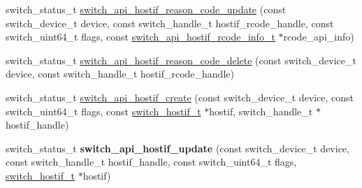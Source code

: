\begin{DoxyCompactItemize}
\item 
switch\+\_\+status\+\_\+t \hyperlink{group__HostInterface_ga6dd335d280eb94c14d97bece73a66b8d}{switch\+\_\+api\+\_\+hostif\+\_\+reason\+\_\+code\+\_\+update} (const switch\+\_\+device\+\_\+t device, const switch\+\_\+handle\+\_\+t hostif\+\_\+rcode\+\_\+handle, const switch\+\_\+uint64\+\_\+t flags, const \hyperlink{group__HostInterface_gad572618a94aec43492d76730093e105f}{switch\+\_\+api\+\_\+hostif\+\_\+rcode\+\_\+info\+\_\+t} $\ast$rcode\+\_\+api\+\_\+info)
\item 
switch\+\_\+status\+\_\+t \hyperlink{group__HostInterface_gab04148c1eb71593a4507380eb574f2d3}{switch\+\_\+api\+\_\+hostif\+\_\+reason\+\_\+code\+\_\+delete} (const switch\+\_\+device\+\_\+t device, const switch\+\_\+handle\+\_\+t hostif\+\_\+rcode\+\_\+handle)
\item 
switch\+\_\+status\+\_\+t \hyperlink{group__HostInterface_ga5d24f6986bc6f45ac5993e7ece399cac}{switch\+\_\+api\+\_\+hostif\+\_\+create} (const switch\+\_\+device\+\_\+t device, const switch\+\_\+uint64\+\_\+t flags, const \hyperlink{group__HostInterface_ga3cd1d0c163caae841da0f87a23e5caf7}{switch\+\_\+hostif\+\_\+t} $\ast$hostif, switch\+\_\+handle\+\_\+t $\ast$hostif\+\_\+handle)
\item 
\hypertarget{group__HostInterface_ga1306c5623c28b14e9d7b68cf146ac394}{switch\+\_\+status\+\_\+t {\bfseries switch\+\_\+api\+\_\+hostif\+\_\+update} (const switch\+\_\+device\+\_\+t device, const switch\+\_\+handle\+\_\+t hostif\+\_\+handle, const switch\+\_\+uint64\+\_\+t flags, \hyperlink{group__HostInterface_ga3cd1d0c163caae841da0f87a23e5caf7}{switch\+\_\+hostif\+\_\+t} $\ast$hostif)}\label{group__HostInterface_ga1306c5623c28b14e9d7b68cf146ac394}


\end{DoxyCompactItemize}
